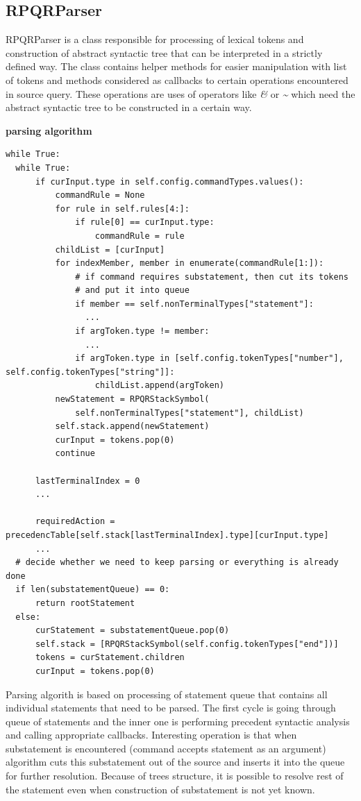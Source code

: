 \subsection*{RPQRParser}

RPQRParser is a class responsible for processing of lexical tokens and construction of abstract syntactic
tree that can be interpreted in a strictly defined way. The class contains helper methods for easier
manipulation with list of tokens and methods considered as callbacks to certain operations encountered
in source query. These operations are uses of operators like \textit{\&} or \textit{\textasciitilde}
which need the abstract syntactic tree to be constructed in a certain way.

\textbf{parsing algorithm}

\begin{lstlisting}
while True:
  while True:
      if curInput.type in self.config.commandTypes.values():
          commandRule = None
          for rule in self.rules[4:]:
              if rule[0] == curInput.type:
                  commandRule = rule
          childList = [curInput]
          for indexMember, member in enumerate(commandRule[1:]):
              # if command requires substatement, then cut its tokens
              # and put it into queue
              if member == self.nonTerminalTypes["statement"]:
                ...
              if argToken.type != member:
                ...
              if argToken.type in [self.config.tokenTypes["number"], self.config.tokenTypes["string"]]:
                  childList.append(argToken)
          newStatement = RPQRStackSymbol(
              self.nonTerminalTypes["statement"], childList)
          self.stack.append(newStatement)
          curInput = tokens.pop(0)
          continue

      lastTerminalIndex = 0
      ...

      requiredAction = precedencTable[self.stack[lastTerminalIndex].type][curInput.type]
      ...
  # decide whether we need to keep parsing or everything is already done
  if len(substatementQueue) == 0:
      return rootStatement
  else:
      curStatement = substatementQueue.pop(0)
      self.stack = [RPQRStackSymbol(self.config.tokenTypes["end"])]
      tokens = curStatement.children
      curInput = tokens.pop(0)
\end{lstlisting}

Parsing algorith is based on processing of statement queue that contains all individual statements
that need to be parsed. The first cycle is going through queue of statements and the inner one is
performing precedent syntactic analysis and calling appropriate callbacks. Interesting operation is
that when substatement is encountered (command accepts statement as an argument) algorithm cuts this
substatement out of the source and inserts it into the queue for further resolution. Because of trees
structure, it is possible to resolve rest of the statement even when construction of substatement is not yet
known.

